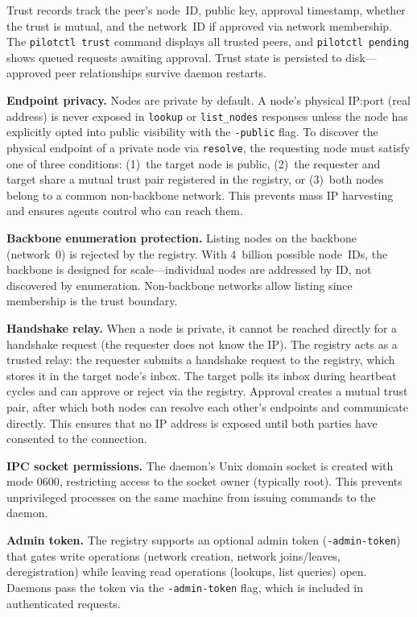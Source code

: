 \documentclass[11pt,a4paper]{article}
\begin{document}
Trust records track the peer's node~ID, public key, approval timestamp, whether the trust is mutual, and the network~ID if approved via network membership. The \texttt{pilotctl trust} command displays all trusted peers, and \texttt{pilotctl pending} shows queued requests awaiting approval. Trust state is persisted to disk---approved peer relationships survive daemon restarts.

\textbf{Endpoint privacy.} Nodes are private by default. A node's physical IP:port (real address) is never exposed in \texttt{lookup} or \texttt{list\_nodes} responses unless the node has explicitly opted into public visibility with the \texttt{-public} flag. To discover the physical endpoint of a private node via \texttt{resolve}, the requesting node must satisfy one of three conditions: (1)~the target node is public, (2)~the requester and target share a mutual trust pair registered in the registry, or (3)~both nodes belong to a common non-backbone network. This prevents mass IP harvesting and ensures agents control who can reach them.

\textbf{Backbone enumeration protection.} Listing nodes on the backbone (network~0) is rejected by the registry. With 4~billion possible node~IDs, the backbone is designed for scale---individual nodes are addressed by ID, not discovered by enumeration. Non-backbone networks allow listing since membership is the trust boundary.

\textbf{Handshake relay.} When a node is private, it cannot be reached directly for a handshake request (the requester does not know the IP). The registry acts as a trusted relay: the requester submits a handshake request to the registry, which stores it in the target node's inbox. The target polls its inbox during heartbeat cycles and can approve or reject via the registry. Approval creates a mutual trust pair, after which both nodes can resolve each other's endpoints and communicate directly. This ensures that no IP address is exposed until both parties have consented to the connection.

\textbf{IPC socket permissions.} The daemon's Unix domain socket is created with mode 0600, restricting access to the socket owner (typically root). This prevents unprivileged processes on the same machine from issuing commands to the daemon.

\textbf{Admin token.} The registry supports an optional admin token (\texttt{-admin-token}) that gates write operations (network creation, network joins/leaves, deregistration) while leaving read operations (lookups, list queries) open. Daemons pass the token via the \texttt{-admin-token} flag, which is included in authenticated requests.
\end{document}
